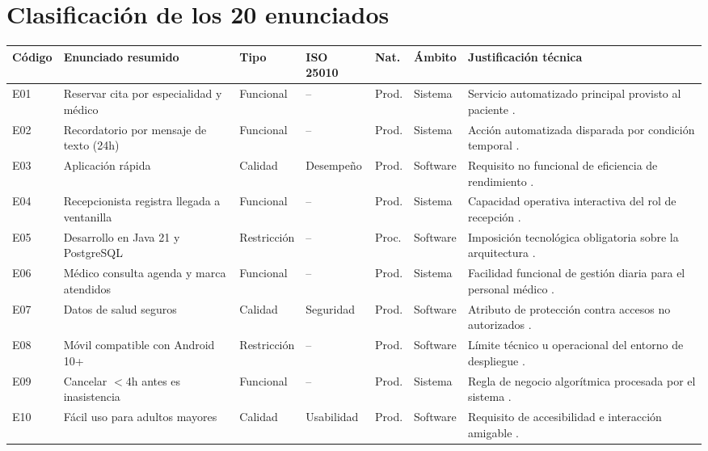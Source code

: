 \documentclass[11pt,a4paper]{article}
\begin{document}
	
	\section{Clasificación de los 20 enunciados}
	\tiny
	\begin{longtable}{|p{0.6cm}|p{3.2cm}|p{1.6cm}|p{1.4cm}|p{1.2cm}|p{1.3cm}|X|}
		\hline
		\rowcolor{verdeUTEQ}
		\textbf{\color{white}Código} & \textbf{\color{white}Enunciado resumido} & \textbf{\color{white}Tipo} & \textbf{\color{white}ISO 25010} & \textbf{\color{white}Nat.} & \textbf{\color{white}Ámbito} & \textbf{\color{white}Justificación técnica} \\ \hline
		\endhead
		
		E01 & Reservar cita por especialidad y médico & Funcional & -- & Prod. & Sistema & Servicio automatizado principal provisto al paciente \cite{sommerville2019}. \\ \hline
		E02 & Recordatorio por mensaje de texto (24h) & Funcional & -- & Prod. & Sistema & Acción automatizada disparada por condición temporal \cite{iso29148}. \\ \hline
		E03 & Aplicación rápida & Calidad & Desempeño & Prod. & Software & Requisito no funcional de eficiencia de rendimiento \cite{iso25010}. \\ \hline
		E04 & Recepcionista registra llegada a ventanilla & Funcional & -- & Prod. & Sistema & Capacidad operativa interactiva del rol de recepción \cite{pohl2025}. \\ \hline
		E05 & Desarrollo en Java 21 y PostgreSQL & Restricción & -- & Proc. & Software & Imposición tecnológica obligatoria sobre la arquitectura \cite{wiegers2013}. \\ \hline
		E06 & Médico consulta agenda y marca atendidos & Funcional & -- & Prod. & Sistema & Facilidad funcional de gestión diaria para el personal médico \cite{sommerville2019}. \\ \hline
		E07 & Datos de salud seguros & Calidad & Seguridad & Prod. & Software & Atributo de protección contra accesos no autorizados \cite{iso25010}. \\ \hline
		E08 & Móvil compatible con Android 10+ & Restricción & -- & Prod. & Software & Límite técnico u operacional del entorno de despliegue \cite{iso29148}. \\ \hline
		E09 & Cancelar $<4$h antes es inasistencia & Funcional & -- & Prod. & Sistema & Regla de negocio algorítmica procesada por el sistema \cite{pohl2025}. \\ \hline
		E10 & Fácil uso para adultos mayores & Calidad & Usabilidad & Prod. & Software & Requisito de accesibilidad e interacción amigable \cite{iso25010}. \\ \hline

\end{longtable}
\end{document}
